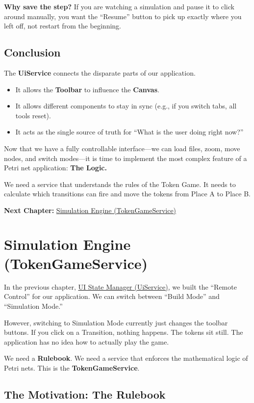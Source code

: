 \documentclass[a4paper,11pt,oneside]{report}
\begin{document}
\textbf{Why save the step?} If you are watching a simulation and pause it to click around manually, you want the ``Resume'' button to pick up exactly where you left off, not restart from the beginning.

\section{Conclusion}

The \textbf{UiService} connects the disparate parts of our application.
\begin{itemize}
    \item It allows the \textbf{Toolbar} to influence the \textbf{Canvas}.
    \item It allows different components to stay in sync (e.g., if you switch tabs, all tools reset).
    \item It acts as the single source of truth for ``What is the user doing right now?''
\end{itemize}

Now that we have a fully controllable interface---we can load files, zoom, move nodes, and switch modes---it is time to implement the most complex feature of a Petri net application: \textbf{The Logic.}

We need a service that understands the rules of the Token Game. It needs to calculate which transitions can fire and move the tokens from Place A to Place B.

\textbf{Next Chapter:} \hyperref[chap:tokengame]{Simulation Engine (TokenGameService)}

\chapter{Simulation Engine (TokenGameService)}
\label{chap:tokengame}

In the previous chapter, \hyperref[chap:uiservice]{UI State Manager (UiService)}, we built the ``Remote Control'' for our application. We can switch between ``Build Mode'' and ``Simulation Mode.''

However, switching to Simulation Mode currently just changes the toolbar buttons. If you click on a Transition, nothing happens. The tokens sit still. The application has no idea how to actually play the game.

We need a \textbf{Rulebook}. We need a service that enforces the mathematical logic of Petri nets. This is the \textbf{TokenGameService}.

\section{The Motivation: The Rulebook}
\end{document}
